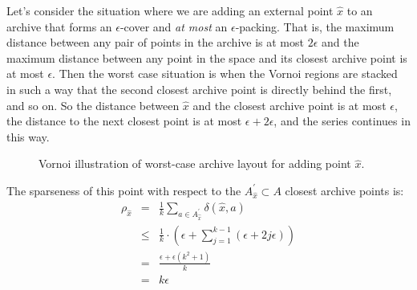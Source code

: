 \documentclass[twoside]{article}
\begin{document}
Let's consider the situation where we are adding an external point $\hat{x}$ to an archive that forms an $\epsilon$-cover and \emph{at most} an $\epsilon$-packing.  That is, the maximum distance between any pair of points in the archive is at most $2\epsilon$ and the maximum distance between any point in the space and its closest archive point is at most $\epsilon$.  Then the worst case situation is when the Vornoi regions are stacked in such a way that the second closest archive point is directly behind the first, and so on.  So the distance between $\hat{x}$ and the closest archive point is at most $\epsilon$, the distance to the next closest point is at most $\epsilon + 2\epsilon$, and the series continues in this way.
%
\begin{figure}[h]
  \center{}
  \caption{\label{fig:vornoi} Vornoi illustration of worst-case archive layout for adding point $\hat{x}$.}
\end{figure}

The sparseness of this point with respect to the $A^\prime_{\hat{x}} \subset A$ closest archive points is:
\begin{eqnarray*}
  \rho_{\hat{x}} & = & \frac{1}{k} \sum_{a \in A^\prime_{\hat{x}}} \delta(\hat{x},a) \\
                 & \leq & \frac{1}{k} \cdot\left( \epsilon + \sum_{j=1}^{k-1} \left( \epsilon + 2j\epsilon \right) \right) \\
                 & = & \frac{\epsilon + \epsilon\left(k^2 +1\right)}{k} \\
                 & = & k\epsilon
\end{eqnarray*}
\end{document}
